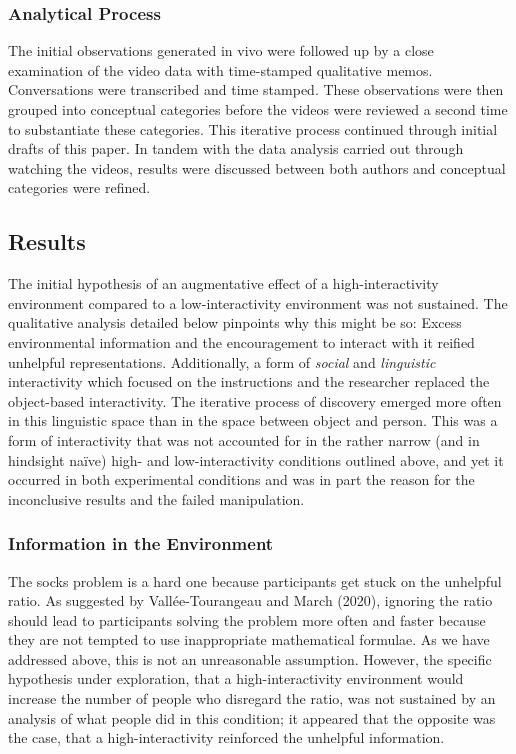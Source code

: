 \hypertarget{analytical-process}{%
\subsubsection{Analytical Process}\label{analytical-process}}

The initial observations generated in vivo were followed up by a close
examination of the video data with time-stamped qualitative memos.
Conversations were transcribed and time stamped. These observations were
then grouped into conceptual categories before the videos were reviewed
a second time to substantiate these categories. This iterative process
continued through initial drafts of this paper. In tandem with the data
analysis carried out through watching the videos, results were discussed
between both authors and conceptual categories were refined.

\hypertarget{results-1}{%
\subsection{Results}\label{results-1}}

The initial hypothesis of an augmentative effect of a high-interactivity
environment compared to a low-interactivity environment was not
sustained. The qualitative analysis detailed below pinpoints why this
might be so: Excess environmental information and the encouragement to
interact with it reified unhelpful representations. Additionally, a form
of \emph{social} and \emph{linguistic} interactivity which focused on
the instructions and the researcher replaced the object-based
interactivity. The iterative process of discovery emerged more often in
this linguistic space than in the space between object and person. This
was a form of interactivity that was not accounted for in the rather
narrow (and in hindsight naïve) high- and low-interactivity conditions
outlined above, and yet it occurred in both experimental conditions and
was in part the reason for the inconclusive results and the failed
manipulation.

\hypertarget{information-in-the-environment}{%
\subsubsection{Information in the
Environment}\label{information-in-the-environment}}

The socks problem is a hard one because participants get stuck on the
unhelpful ratio. As suggested by Vallée-Tourangeau and March (2020),
ignoring the ratio should lead to participants solving the problem more
often and faster because they are not tempted to use inappropriate
mathematical formulae. As we have addressed above, this is not an
unreasonable assumption. However, the specific hypothesis under
exploration, that a high-interactivity environment would increase the
number of people who disregard the ratio, was not sustained by an
analysis of what people did in this condition; it appeared that the
opposite was the case, that a high-interactivity reinforced the
unhelpful information.

